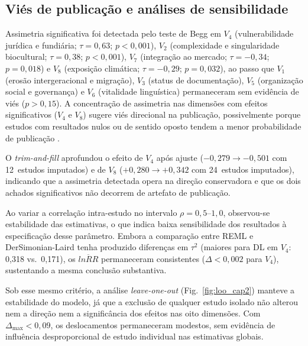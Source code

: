 \subsection{Viés de publicação e análises de sensibilidade}
\label{sec:bias-sensitivity_cap2}

Assimetria significativa foi detectada pelo teste de Begg em $V_4$ (vulnerabilidade jurídica e fundiária; $\tau = 0{,}63$; $p < 0{,}001$), $V_2$ (complexidade e singularidade biocultural; $\tau = 0{,}38$; $p < 0{,}001$), $V_7$ (integração ao mercado; $\tau = -0{,}34$; $p = 0{,}018$) e $V_8$ (exposição climática; $\tau = -0{,}29$; $p = 0{,}032$), ao passo que $V_1$ (erosão intergeracional e migração), $V_3$ (status de documentação), $V_5$ (organização social e governança) e $V_6$ (vitalidade linguística) permaneceram sem evidência de viés ($p > 0{,}15$). A concentração de assimetria nas dimensões com efeitos significativos ($V_4$ e $V_8$) sugere viés direcional na publicação, possivelmente porque estudos com resultados nulos ou de sentido oposto tendem a menor probabilidade de publicação \cite{Song2010}. 

O \textit{trim-and-fill} aprofundou o efeito de $V_4$ após ajuste ($-0{,}279 \to -0{,}501$ com 12~estudos imputados) e de $V_8$ ($+0{,}280 \to +0{,}342$ com 24~estudos imputados), indicando que a assimetria detectada opera na direção conservadora e que os dois achados significativos não decorrem de artefato de publicação. 

Ao variar a correlação intra-estudo no intervalo $\rho = 0{,}5\text{--}1{,}0$, observou-se estabilidade das estimativas, o que indica baixa sensibilidade dos resultados à especificação desse parâmetro. Embora a comparação entre REML e DerSimonian-Laird tenha produzido diferenças em $\tau^2$ (maiores para DL em $V_4$: 0,318 vs.\ 0,171), os $\overline{lnRR}$ permaneceram consistentes ($\Delta < 0{,}002$ para $V_4$), sustentando a mesma conclusão substantiva. 

Sob esse mesmo critério, a análise \textit{leave-one-out} (Fig.~\ref{fig:loo_cap2}) manteve a estabilidade do modelo, já que a exclusão de qualquer estudo isolado não alterou nem a direção nem a significância dos efeitos nas oito dimensões. Com $\Delta_{\max} < 0{,}09$, os deslocamentos permaneceram modestos, sem evidência de influência desproporcional de estudo individual nas estimativas globais.

